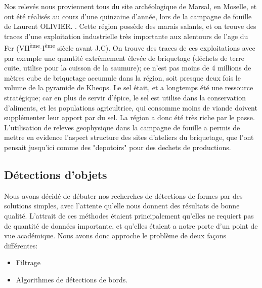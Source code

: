 \documentclass[a4paper, 12pt, titlepage, oneside, french]{article}
\begin{document}
	Nos relevés nous proviennent tous du site archéologique de Marsal, en Moselle, et ont été réalisés au cours d'une quinzaine d'année, lors de la campagne de fouille de Laurent OLIVIER.%
	. Cette région possède des marais salants, et on trouve des traces d'une exploitation industrielle très importante aux alentours de l'age du Fer (VII\textsuperscript{ème}-I\textsuperscript{ème} siècle avant J.C). On trouve des traces de ces exploitations avec par exemple une quantité extrêmement élevée de briquetage (déchets de terre cuite, utilise pour la cuisson de la saumure); ce n'est pas moins de 4 millions de mètres cube de briquetage accumule dans la région, soit presque deux fois le volume de la pyramide de Kheops. Le sel était, et a longtemps été une ressource stratégique; car en plus de servir d'épice, le sel est utilise dans la conservation d'aliments, et les populations agricultrice, qui consomme moins de viande doivent supplémenter leur apport par du sel. La région a donc été très riche par le passe. 
	L'utilisation de releves geophysique dans la campagne de fouille a permis de mettre en evidence l'aspect structure des sites d'ateliers du briquetage, que l'ont pensait jusqu'ici comme des "depotoirs" pour des dechets de productions.  

	\newpage
	\newpage
	\subsection{Détections d'objets}
	Nous avons décidé de débuter nos recherches de détections de formes par des solutions simples, avec l'attente qu'elle nous donnent des résultats de bonne qualité. L'attrait de ces méthodes étaient principalement qu'elles ne requiert pas de quantité de données importante, et qu'elles étaient a notre porte d'un point de vue académique. Nous avons donc approche le problème de deux façons différentes:
	\begin{itemize}
		\item Filtrage
		\item Algorithmes de détections de bords.
	\end{itemize}
\end{document}
